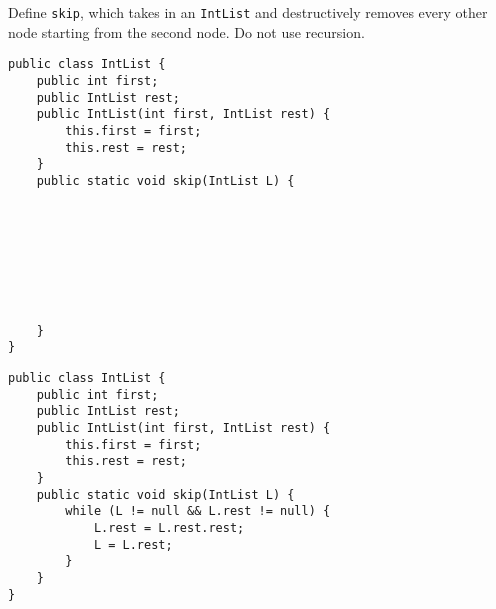 \begin{blocksection}
\question Define \lstinline$skip$, which takes in an \lstinline$IntList$ and
destructively removes every other node starting from the second node. Do not
use recursion.

\ifprintanswers\else
\begin{lstlisting}
public class IntList {
    public int first;
    public IntList rest;
    public IntList(int first, IntList rest) {
        this.first = first;
        this.rest = rest;
    }
    public static void skip(IntList L) {








    }
}
\end{lstlisting}
\fi

\begin{solution}
\begin{lstlisting}
public class IntList {
    public int first;
    public IntList rest;
    public IntList(int first, IntList rest) {
        this.first = first;
        this.rest = rest;
    }
    public static void skip(IntList L) {
        while (L != null && L.rest != null) {
            L.rest = L.rest.rest;
            L = L.rest;
        }
    }
}
\end{lstlisting}
\end{solution}
\end{blocksection}
